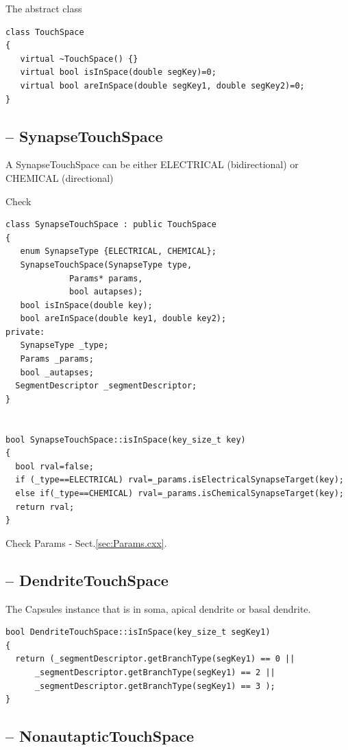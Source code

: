 The abstract class
\begin{verbatim}
class TouchSpace
{
   virtual ~TouchSpace() {}
   virtual bool isInSpace(double segKey)=0;
   virtual bool areInSpace(double segKey1, double segKey2)=0;
}
\end{verbatim}


\subsection{-- SynapseTouchSpace}
\label{sec:SynapseTouchSpace}

A SynapseTouchSpace can be either ELECTRICAL (bidirectional) or CHEMICAL
(directional)


Check
\begin{verbatim}
class SynapseTouchSpace : public TouchSpace
{
   enum SynapseType {ELECTRICAL, CHEMICAL};
   SynapseTouchSpace(SynapseType type,
		     Params* params,
		     bool autapses);
   bool isInSpace(double key);
   bool areInSpace(double key1, double key2);
private:
   SynapseType _type;
   Params _params;
   bool _autapses;
  SegmentDescriptor _segmentDescriptor;
}


bool SynapseTouchSpace::isInSpace(key_size_t key)
{ 
  bool rval=false;
  if (_type==ELECTRICAL) rval=_params.isElectricalSynapseTarget(key);
  else if(_type==CHEMICAL) rval=_params.isChemicalSynapseTarget(key);
  return rval;
}
\end{verbatim}
Check Params - Sect.\ref{sec:Params.cxx}.


\subsection{-- DendriteTouchSpace}
\label{sec:DendriteTouchSpace}

The Capsules instance that is in soma, apical dendrite or basal
dendrite.

\begin{verbatim}
bool DendriteTouchSpace::isInSpace(key_size_t segKey1)
{
  return (_segmentDescriptor.getBranchType(segKey1) == 0 ||
	  _segmentDescriptor.getBranchType(segKey1) == 2 || 
	  _segmentDescriptor.getBranchType(segKey1) == 3 );
}
\end{verbatim}

\subsection{-- NonautapticTouchSpace}
\label{sec:NonautapticTouchSpace}

